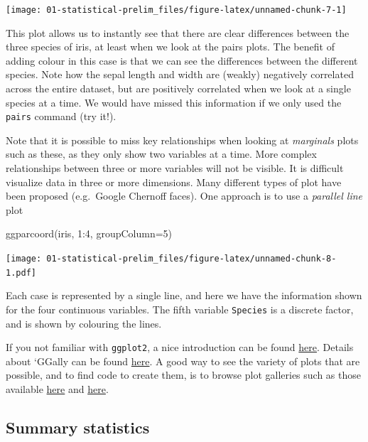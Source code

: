 \documentclass[
]{book}
\newenvironment{Shaded}{\begin{snugshade}}{\end{snugshade}}
\newcommand{\AttributeTok}[1]{\textcolor[rgb]{0.77,0.63,0.00}{#1}}
\newcommand{\DecValTok}[1]{\textcolor[rgb]{0.00,0.00,0.81}{#1}}
\newcommand{\FunctionTok}[1]{\textcolor[rgb]{0.00,0.00,0.00}{#1}}
\newcommand{\NormalTok}[1]{#1}
\newcommand{\SpecialCharTok}[1]{\textcolor[rgb]{0.00,0.00,0.00}{#1}}
\theoremstyle{definition}
\theoremstyle{definition}
\theoremstyle{definition}
\theoremstyle{definition}
\theoremstyle{remark}
\begin{document}
\texttt{[image: 01-statistical-prelim\_files/figure-latex/unnamed-chunk-7-1]}

This plot allows us to instantly see that there are clear differences between the three species of iris, at least when we look at the pairs plots. The benefit of adding colour in this case is that we can see the differences between the different species. Note how the sepal length and width are (weakly) negatively correlated across the entire dataset, but are positively correlated when we look at a single species at a time. We would have missed this information if we only used the \texttt{pairs} command (try it!).

Note that it is possible to miss key relationships when looking at \emph{marginals} plots such as these, as they only show two variables at a time. More complex relationships between three or more variables will not be visible. It is difficult visualize data in three or more dimensions. Many different types of plot have been proposed (e.g.~Google Chernoff faces). One approach is to use a \emph{parallel line} plot

\begin{Shaded}
\begin{Highlighting}[]
\FunctionTok{ggparcoord}\NormalTok{(iris, }\DecValTok{1}\SpecialCharTok{:}\DecValTok{4}\NormalTok{, }\AttributeTok{groupColumn=}\DecValTok{5}\NormalTok{)}
\end{Highlighting}
\end{Shaded}

\texttt{[image: 01-statistical-prelim\_files/figure-latex/unnamed-chunk-8-1.pdf]}

Each case is represented by a single line, and here we have the information shown for the four continuous variables. The fifth variable \texttt{Species} is a discrete factor, and is shown by colouring the lines.

If you not familiar with \texttt{ggplot2}, a nice introduction can be found \href{https://ggplot2.tidyverse.org/}{here}. Details about `GGally can be found \href{https://ggobi.github.io/ggally/}{here}. A good way to see the variety of plots that are possible, and to find code to create them, is to browse plot galleries such as those available
\href{https://www.r-graph-gallery.com/ggplot2-package.html}{here}
and \href{https://www.data-to-viz.com}{here}.

\hypertarget{summary-statistics}{%
\subsection{Summary statistics}\label{summary-statistics}}
\end{document}
